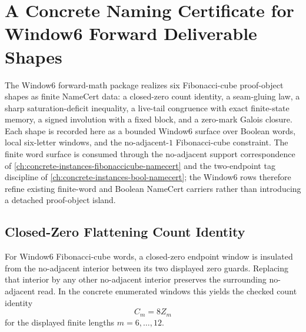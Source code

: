 \chapter{A Concrete Naming Certificate for Window6 Forward Deliverable Shapes}
\label{ch:concrete-instances-window6-forward-deliverable-shapes-namecert}

The Window6 forward-math package realizes six Fibonacci-cube proof-object shapes as finite NameCert data: a closed-zero count identity, a seam-gluing law, a sharp saturation-deficit inequality, a live-tail congruence with exact finite-state memory, a signed involution with a fixed block, and a zero-mark Galois closure. Each shape is recorded here as a bounded Window6 surface over Boolean words, local six-letter windows, and the no-adjacent-$1$ Fibonacci-cube constraint. The finite word surface is consumed through the no-adjacent support correspondence of \autoref{ch:concrete-instances-fibonaccicube-namecert} and the two-endpoint tag discipline of \autoref{ch:concrete-instances-bool-namecert}; the Window6 rows therefore refine existing finite-word and Boolean NameCert carriers rather than introducing a detached proof-object island.

\section{Closed-Zero Flattening Count Identity}
\label{sec:window6-closed-zero-flattening-count-identity}

\begin{theorem}
\label{thm:window6-closed-zero-flattening-count-identity}
For Window6 Fibonacci-cube words, a closed-zero endpoint window is insulated from the no-adjacent interior between its two displayed zero guards. Replacing that interior by any other no-adjacent interior preserves the surrounding no-adjacent read. In the concrete enumerated windows this yields the checked count identity
$$
C_m=8Z_m
$$
for the displayed finite lengths $m=6,\ldots,12$.
\end{theorem}

